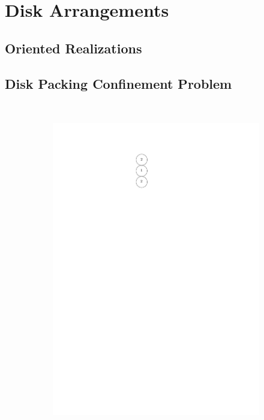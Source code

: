 \section{Disk Arrangements}

\subsection{Oriented Realizations}
\subsection{Disk Packing Confinement Problem}
\begin{figure}[h]
\begin{center}
  ~ %
  \begin{subfigure}[b]{0.1\textwidth}
	  \includegraphics[width=\textwidth]{graphics/degree2arrangement.pdf}

\end{subfigure}
\end{center}
\end{figure}
